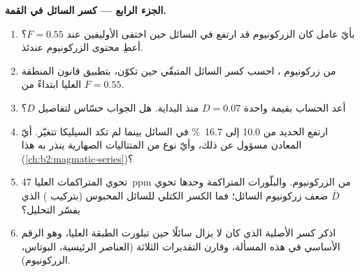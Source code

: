 \begin{problem}
\noindent\textbf{الجزء الرابع --- كسر السائل في القمة.}
\begin{enumerate}[resume]
\item بأيّ عامل كان الزركونيوم قد ارتفع في السائل حين اختفى الأوليفين عند
$F = 0.55$؟ أعطِ محتوى الزركونيوم عندئذ.
\item من زركونيوم ، احسب كسر السائل المتبقّي حين
تكوّن، بتطبيق قانون المنطقة العليا ابتداءً من $F = 0.55$.
\item أعد الحساب بقيمة واحدة $D = 0.07$ منذ البداية. هل الجواب
حسّاس لتفاصيل $D$؟
\item ارتفع الحديد من 10.0 إلى \qty{16.7}{\percent} في السائل بينما لم تكد السيليكا
تتغيّر. أيّ المعادن مسؤول عن ذلك، وأيّ نوع من المتتاليات الصهارية
ينذر به هذا (\cref{ch:b2:magmatic-series})؟
\item تحوي المتراكمات العليا \qty{47}{ppm} من الزركونيوم. والبلّورات المتراكمة وحدها تحوي
$\bar D$ ضعف زركونيوم السائل؛ فما الكسر الكتلي للسائل المحبوس
(بتركيب ) الذي يفسّر التحليل؟
\item اذكر كسر  الأصلية الذي كان لا يزال سائلًا حين تبلورت
الطبقة العليا، وهو الرقم الأساسي في هذه المسألة، وقارن التقديرات الثلاثة
(العناصر الرئيسية، البوتاس، الزركونيوم).
\end{enumerate}
\end{problem}
